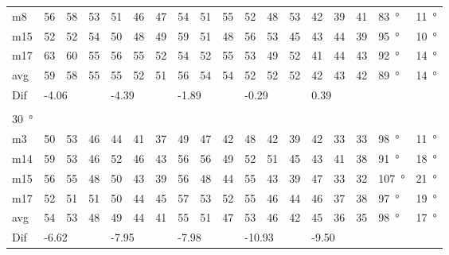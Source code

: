 \begin{table}[H]
\begin{tabular}{l|l|l|l|l|l|l|l|l|l|l|l|l|l|l|l|l|l}
m8    &  56    &  58   &   53   &   51   &   46   &  47    &   54   &   51    &   55   &    52   &    48  &   53   & 42 & 39 & 41 &  \SI{83}{\degree} & \SI{11}{\degree}   \\
m15  &  52    & 52     &   54   &  50    &  48    &  49    & 59     &    51   &   48   &   56    &   53   &   45   & 43 & 44 & 39 & \SI{95}{\degree} & \SI{10}{\degree}  \\
m17  &  63    & 60     &  55    &  56    & 55     &  52    &  54    &   52    &    55  &   53    &   49   & 52     & 41 & 44 & 43 & \SI{92}{\degree} & \SI{14}{\degree}  \\ \hline
avg & 59     & 58     &  55    &  55    &  52    &  51    &  56    &   54    & 54     &    52   &   52   &  52    & 42 & 43  & 42  & \SI{89}{\degree} & \SI{14}{\degree}  \\ \hline  
Dif & \multicolumn{3}{l|}{-4.06} & \multicolumn{3}{l|}{-4.39} & \multicolumn{3}{l|}{-1.89} & \multicolumn{3}{l|}{-0.29} & \multicolumn{3}{l|}{0.39} & \multicolumn{2}{l}{} \\ 
 \multicolumn{18}{l}{ } \\                             
\SI{30}{\degree}   & \multicolumn{3}{l|}{} & \multicolumn{3}{l|}{} & \multicolumn{3}{l|}{} & \multicolumn{3}{l|}{} & \multicolumn{3}{l|}{} &  \multicolumn{2}{l}{}   \\  \hline
m3    & 50     &  53    &  46    &  44    &  41    &  37    &  49    &   47    &   42   &   48    &  42    &   39   & 42 & 33 &33 & \SI{98}{\degree} & \SI{11}{\degree}   \\
m14  & 59     &  53    &  46    &  52    &   46   &  43    &  56    &  56     &  49    &   52    &   51   &   45   & 43 & 41 & 38 & \SI{91}{\degree}  & \SI{18}{\degree}  \\
m15  &  56    &  55    &  48    &   50   &   43   &   39   &   56   &  48     & 44     &    55   &   43   &   39   & 47 & 33 & 32 & \SI{107}{\degree} &  \SI{21}{\degree}  \\
m17  & 52     &  51    &  51    &  50    &  44    &    45  &   57   &   53    &  52    &  55     &  46    &   44   & 46 & 37 &  38 & \SI{97}{\degree} & \SI{19}{\degree}   \\ \hline
avg &  54    & 53     &  48    &  49    &  44    &  41    &  55    &   51    &  47    &   53    &   46   &  42    & 45 & 36  & 35 & \SI{98}{\degree} & \SI{17}{\degree}  \\ \hline  
Dif & \multicolumn{3}{l|}{-6.62} & \multicolumn{3}{l|}{-7.95} & \multicolumn{3}{l|}{-7.98} & \multicolumn{3}{l|}{-10.93} & \multicolumn{3}{l|}{-9.50}      &     \multicolumn{2}{l}{}              
\end{tabular}
\end{table}


